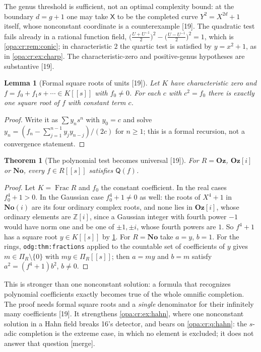 \documentclass[11pt,oneside]{article}
\numberwithin{equation}{section}
\newtheorem{theorem}{Theorem}[section]
\newtheorem{lemma}[lemma]{Lemma}
\theoremstyle{definition}
\theoremstyle{remark}
\newcommand{\No}{\mathbf{No}}
\newcommand{\Oz}{\mathbf{Oz}}
\newcommand{\Og}{\mathbf{Oz}[i]}
\newcommand{\SC}{\mathbf{No}(i)}
\newcommand{\Z}{\mathbb Z}
\newcommand{\Frac}{\operatorname{Frac}}
\newcommand{\src}[1]{\textup{\textsf{\small[#1]}}}
\newcommand{\mergetag}{\textup{\textsf{\small[merge]}}}
\newcommand{\lbl}[1]{\nolinkurl{#1}}
\begin{document}
The genus threshold is sufficient, not an optimal complexity bound: at the boundary $d=g+1$ one may take $\mathsf X$ to be the completed curve
$Y^2=X^{2d}+1$ itself, whose nonconstant coordinate is a counterexample \src{19}. The quadratic test fails already in a rational function field,
$\bigl(\frac{U+U^{-1}}2\bigr)^2-\bigl(\frac{U-U^{-1}}2\bigr)^2=1$, which is \cref{opa:cr:rem:conic}; in characteristic $2$ the quartic test is satisfied by
$y=x^2+1$, as in \cref{opa:cr:ex:charp}. The characteristic-zero and positive-genus hypotheses are substantive \src{19}.

\begin{lemma}[Formal square roots of units \src{19}]\label{opa:hs:lem:sqrt}
Let $K$ have characteristic zero and $f=f_0+f_1s+\cdots\in K[[s]]$ with $f_0\ne0$. For each $c$ with $c^2=f_0$ there is exactly one square root of $f$ with
constant term $c$.
\end{lemma}
\begin{proof}
Write it as $\sum y_ns^n$ with $y_0=c$ and solve $y_n=(f_n-\sum_{j=1}^{n-1}y_jy_{n-j})/(2c)$ for $n\ge1$; this is a formal recursion, not a convergence
statement.
\end{proof}

\begin{theorem}[The polynomial test becomes universal \src{19}]\label{opa:hs:thm:collapse}
For $R=\Oz$, $\Og$ or $\No$, every $f\in R[[s]]$ satisfies $\mathsf Q(f)$.
\end{theorem}
\begin{proof}
Let $K=\Frac R$ and $f_0$ the constant coefficient. In the real cases $f_0^4+1>0$. In the Gaussian case $f_0^4+1\ne0$ as well: the roots of $X^4+1$ in $\SC$
are its four ordinary complex roots, and none lies in $\Og$, whose ordinary elements are $\Z[i]$, since a Gaussian integer with fourth power $-1$ would
have norm one and be one of $\pm1,\pm i$, whose fourth powers are $1$. So $f^4+1$ has a square root $y\in K[[s]]$ by \cref{opa:hs:lem:sqrt}. For
$R=\No$ take $a=y$, $b=1$. For the rings, \lbl{odg:thm:fractions} applied to the countable set of coefficients of $y$ gives $m\in\Pi_R\setminus\{0\}$ with
$my\in\Pi_R[[s]]$; then $a=my$ and $b=m$ satisfy $a^2=(f^4+1)b^2$, $b\ne0$.
\end{proof}

This is stronger than one nonconstant solution: a formula that recognizes polynomial coefficients exactly becomes true of the whole omnific completion.
The proof needs formal square roots and a \emph{single} denominator for their infinitely many coefficients \src{19}. It strengthens
\cref{opa:cr:ex:hahn}, where one nonconstant solution in a Hahn field breaks 16's detector, and bears on \cref{opa:cr:q:hahn}: the $s$-adic completion is the
extreme case, in which no element is excluded; it does not answer that question \mergetag.
\end{document}
